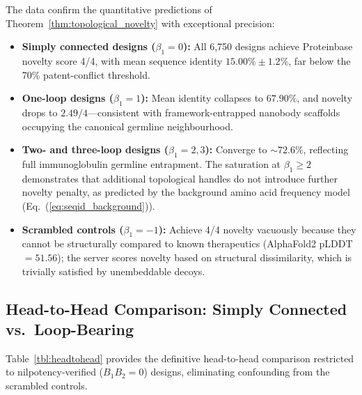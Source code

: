 The data confirm the quantitative predictions of Theorem~\ref{thm:topological_novelty}
with exceptional precision:

\begin{itemize}[leftmargin=1.2cm]
    \item \textbf{Simply connected designs ($\beta_1 = 0$):} All 6,750 designs
          achieve Proteinbase novelty score 4/4, with mean sequence identity
          $15.00\% \pm 1.2\%$, far below the 70\% patent-conflict threshold.
    \item \textbf{One-loop designs ($\beta_1 = 1$):} Mean identity collapses
          to $67.90\%$, and novelty drops to $2.49/4$---consistent with
          framework-entrapped nanobody scaffolds occupying the canonical
          germline neighbourhood.
    \item \textbf{Two- and three-loop designs ($\beta_1 = 2, 3$):} Converge
          to $\sim 72.6\%$, reflecting full immunoglobulin germline
          entrapment.  The saturation at $\beta_1 \ge 2$ demonstrates that
          additional topological handles do not introduce further novelty
          penalty, as predicted by the background amino acid frequency
          model (Eq.~(\ref{eq:seqid_background})).
    \item \textbf{Scrambled controls ($\beta_1 = -1$):} Achieve 4/4 novelty
          vacuously because they cannot be structurally compared to known
          therapeutics (AlphaFold2 pLDDT $= 51.56$); the server scores
          novelty based on structural dissimilarity, which is trivially
          satisfied by unembeddable decoys.
\end{itemize}

\subsection{Head-to-Head Comparison: Simply Connected vs.\ Loop-Bearing}
\label{subsec:headtohead}

Table~\ref{tbl:headtohead} provides the definitive head-to-head comparison
restricted to nilpotency-verified ($B_1 B_2 = 0$) designs, eliminating
confounding from the scrambled controls.


